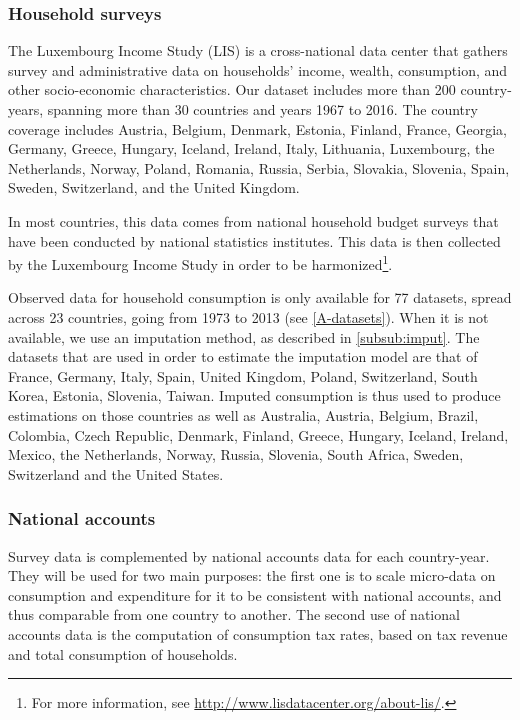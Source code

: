 \documentclass[12pt]{article}
\begin{document}
\subsubsection{Household surveys}
\label{sec:LISdata}
The Luxembourg Income Study (LIS) is a cross-national data center that gathers survey and administrative data on households' income, wealth, consumption, and other socio-economic characteristics. Our dataset includes more than 200 country-years, spanning more than 30 countries and years 1967 to 2016. The country coverage includes Austria, Belgium, Denmark, Estonia, Finland, France, Georgia, Germany, Greece, Hungary, Iceland, Ireland, Italy, Lithuania, Luxembourg, the Netherlands, Norway, Poland, Romania, Russia, Serbia, Slovakia, Slovenia, Spain, Sweden, Switzerland, and the United Kingdom. 

In most countries, this data comes from national household budget surveys that have been conducted by national statistics institutes. This data is then collected by the Luxembourg Income Study in order to be harmonized\footnote{For more information, see \url{http://www.lisdatacenter.org/about-lis/}.}.

Observed data for household consumption is only available for 77 datasets, spread across 23 countries, going from 1973 to 2013 (see \cref{A-datasets}). When it is not available, we use an imputation method, as described in \cref{subsub:imput}. The datasets that are used in order to estimate the imputation model are that of France, Germany, Italy, Spain, United Kingdom, Poland, Switzerland, South Korea, Estonia, Slovenia, Taiwan. Imputed consumption is thus used to produce estimations on those countries as well as Australia, Austria, Belgium, Brazil, Colombia, Czech Republic, Denmark, Finland, Greece, Hungary, Iceland, Ireland, Mexico, the Netherlands, Norway, Russia, Slovenia, South Africa, Sweden, Switzerland and the United States. 


\subsubsection{National accounts}
\label{subsub:data}
Survey data is complemented by national accounts data for each country-year. They will be used for two main purposes: the first one is to scale micro-data on consumption and expenditure for it to be consistent with national accounts, and thus comparable from one country to another. The second use of national accounts data is the computation of consumption tax rates, based on tax revenue and total consumption of households.
\end{document}
